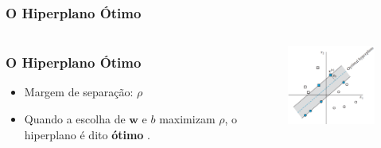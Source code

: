 \documentclass{beamer}
\begin{document}
\begin{frame}
	\frametitle{O Hiperplano Ótimo}
	\begin{columns}
		\begin{column}{0.5\textwidth}  
			\begin{center}
				\frametitle{O Hiperplano Ótimo}
				\begin{itemize}
					\item Margem de separação: $\rho$
					\item Quando a escolha de $\textbf{w}$ e $b$ maximizam $\rho$, o hiperplano é dito \textbf{ótimo} \cite{haykin}.
				\end{itemize}
			\end{center}
		\end{column}
		\begin{column}{0.5\textwidth}
			\begin{figure}[h!]
			\centering
			\includegraphics[width=2.2in]{fig03.png}
			\label{fig:haykin-01}
			\end{figure}
		\end{column}

	\end{columns}
	
\end{frame}
\end{document}
